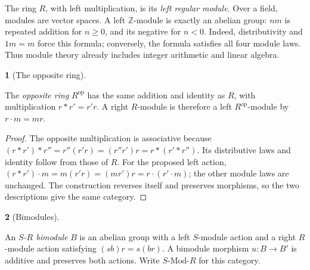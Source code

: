 \documentclass[11pt,a4paper]{article}
\newcommand{\mathheading}{}
\theoremstyle{plain}
\theoremstyle{definition}
\newtheorem*{definitionstatement}{\mathheading}
\newenvironment{mathdefinition}[3]{\renewcommand{\mathheading}{#1 #2}\begin{definitionstatement}[#3]}{\end{definitionstatement}}
\begin{document}
The ring \(R\), with left multiplication, is its \emph{left regular module}. Over a field, modules are vector spaces. A left \(\mathbb Z\)-module is exactly an abelian group: \(nm\) is repeated addition for \(n\geq0\), and its negative for \(n<0\). Indeed, distributivity and \(1m=m\) force this formula; conversely, the formula satisfies all four module laws. Thus module theory already includes integer arithmetic and linear algebra.

 
\begin{mathdefinition}{Definition}{5.2}{The opposite ring}
\label{env-5-2}

The \emph{opposite ring} \(R^{\mathrm{op}}\) has the same addition and identity as \(R\), with multiplication \(r\mathbin{*}r'=r'r\). A right \(R\)-module is therefore a left \(R^{\mathrm{op}}\)-module by \(r\cdot m=mr\).


\par{}\par

\end{mathdefinition}
 
\begin{proof}

The opposite multiplication is associative because \((r*r')*r''=r''(r'r)=(r''r')r=r*(r'*r'')\). Its distributive laws and identity follow from those of \(R\). For the proposed left action, \((r*r')\cdot m=m(r'r)=(mr')r=r\cdot(r'\cdot m)\); the other module laws are unchanged. The construction reverses itself and preserves morphisms, so the two descriptions give the same category.


\end{proof}
 
\begin{mathdefinition}{Definition}{5.3}{Bimodules}
\label{env-5-3}

An \emph{\(S\)-\(R\) bimodule} \(B\) is an abelian group with a left \(S\)-module action and a right \(R\)-module action satisfying \((sb)r=s(br)\). A bimodule morphism \(u:B\to B'\) is additive and preserves both actions. Write \(S\text{-}\mathrm{Mod}\text{-}R\) for this category.


\par{}\par

\end{mathdefinition}
 
\end{document}
